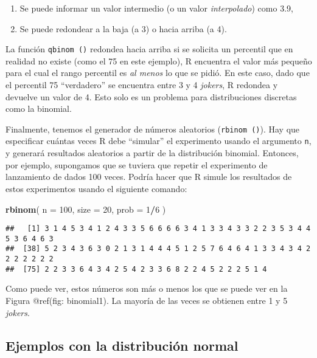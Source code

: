\documentclass[
]{book}
\newenvironment{Shaded}{\begin{snugshade}}{\end{snugshade}}
\newcommand{\DataTypeTok}[1]{\textcolor[rgb]{0.13,0.29,0.53}{#1}}
\newcommand{\DecValTok}[1]{\textcolor[rgb]{0.00,0.00,0.81}{#1}}
\newcommand{\KeywordTok}[1]{\textcolor[rgb]{0.13,0.29,0.53}{\textbf{#1}}}
\newcommand{\NormalTok}[1]{#1}
\newcommand{\OperatorTok}[1]{\textcolor[rgb]{0.81,0.36,0.00}{\textbf{#1}}}
\providecommand{\tightlist}{%
  \setlength{\itemsep}{0pt}\setlength{\parskip}{0pt}}
\begin{document}
\begin{enumerate}
\def\labelenumi{\arabic{enumi}.}
\tightlist
\item
  Se puede informar un valor intermedio (o un valor \emph{interpolado}) como 3.9,
\item
  Se puede redondear a la baja (a 3) o hacia arriba (a 4).
\end{enumerate}

La función \texttt{qbinom\ ()} redondea hacia arriba si se solicita un percentil que en realidad no existe (como el 75 en este ejemplo), R encuentra el valor más pequeño para el cual el rango percentil es \emph{al menos} lo que se pidió. En este caso, dado que el percentil 75 ``verdadero'' se encuentra entre 3 y 4 \emph{jokers}, R redondea y devuelve un valor de 4. Esto solo es un problema para distribuciones discretas como la binomial.

Finalmente, tenemos el generador de números aleatorios (\texttt{rbinom\ ()}). Hay que especificar cuántas veces R debe ``simular'' el experimento usando el argumento \texttt{n}, y generará resultados aleatorios a partir de la distribución binomial. Entonces, por ejemplo, supongamos que se tuviera que repetir el experimento de lanzamiento de dados 100 veces. Podría hacer que R simule los resultados de estos experimentos usando el siguiente comando:

\begin{Shaded}
\begin{Highlighting}[]
\KeywordTok{rbinom}\NormalTok{( }\DataTypeTok{n =} \DecValTok{100}\NormalTok{, }\DataTypeTok{size =} \DecValTok{20}\NormalTok{, }\DataTypeTok{prob =} \DecValTok{1}\OperatorTok{/}\DecValTok{6}\NormalTok{ )}
\end{Highlighting}
\end{Shaded}

\begin{verbatim}
##   [1] 3 1 4 5 3 4 1 2 4 3 3 5 6 6 6 6 3 4 1 3 3 4 3 3 2 2 3 5 3 4 4 5 3 6 4 6 3
##  [38] 5 2 3 4 3 6 3 0 2 1 3 1 4 4 4 5 1 2 5 7 6 4 6 4 1 3 3 4 3 4 2 2 2 2 2 2 2
##  [75] 2 2 3 3 6 4 3 4 2 5 4 2 3 3 6 8 2 2 4 5 2 2 2 5 1 4
\end{verbatim}

Como puede ver, estos números son más o menos los que se puede ver en la Figura @ref(fig: binomial1). La mayoría de las veces se obtienen entre 1 y 5 \emph{jokers}.

\hypertarget{ejemplos-con-la-distribuciuxf3n-normal}{%
\subsection{Ejemplos con la distribución normal}\label{ejemplos-con-la-distribuciuxf3n-normal}}
\end{document}
